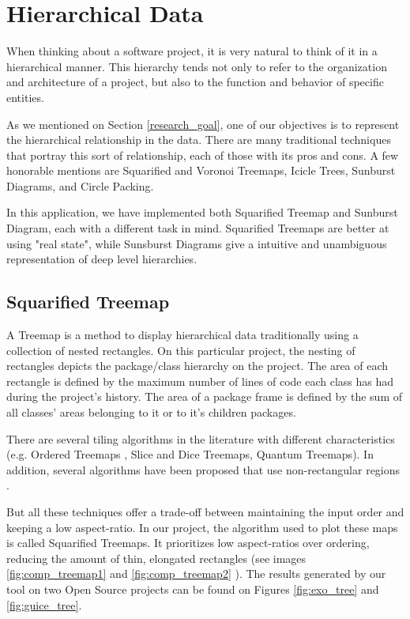 \section{Hierarchical Data} \label{sec:hierarchy}
When thinking about a software project, it is very natural to think of it in a hierarchical manner. This hierarchy tends not only to refer to the organization and architecture of a project, but also to the function and behavior of specific entities.

As we mentioned on Section \ref{research_goal}, one of our objectives is to represent the hierarchical relationship in the data. There are many traditional techniques that portray this sort of relationship, each of those with its pros and cons. A few honorable mentions are Squarified and Voronoi Treemaps, Icicle Trees, Sunburst Diagrams, and Circle Packing.

In this application, we have implemented both Squarified Treemap and Sunburst Diagram, each with a different task in mind. Squarified Treemaps are better at using "real state", while Sunsburst Diagrams give a intuitive and unambiguous representation of deep level hierarchies.

\subsection{Squarified Treemap}
A Treemap is a method to display hierarchical data traditionally using a collection of nested rectangles. On this particular project, the nesting of rectangles depicts the package/class hierarchy on the project. The area of each rectangle is defined by the maximum number of lines of code each class has had during the project's history. The area of a package frame is defined by the sum of all classes' areas belonging to it or to it's children packages.

There are several tiling algorithms in the literature with different characteristics (e.g. Ordered Treemaps \cite{ref:orderedtreemap}, Slice and Dice Treemaps\cite{ref:orderedtreemap}, Quantum Treemaps\cite{ref:quantumtreemap}). In addition, several algorithms have been proposed that use non-rectangular regions  \cite{ref:tree1,ref:tree2,ref:tree3}.

But all these techniques offer a trade-off between maintaining the input order and keeping a low aspect-ratio. In our project, the algorithm used to plot these maps is called Squarified Treemaps\cite{ref:squarified}. It prioritizes low aspect-ratios over ordering, reducing the amount of thin, elongated rectangles (see images \ref{fig:comp_treemap1} and \ref{fig:comp_treemap2} ). The results generated by our tool on two Open Source projects can be found on Figures \ref{fig:exo_tree} and \ref{fig:guice_tree}.

